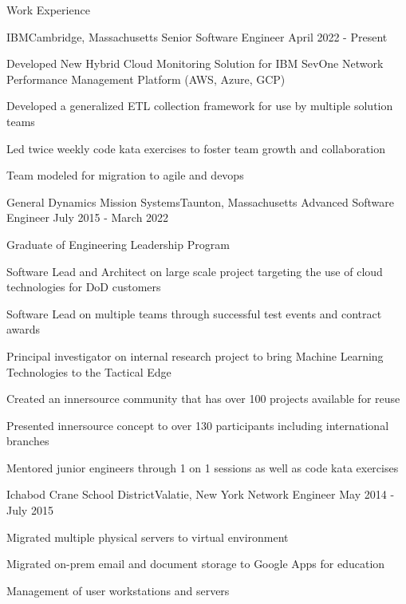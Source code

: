 \documentclass{resume} %
\begin{document}
\begin{rSection}{Work Experience}

\begin{rSubsection}{IBM}{Cambridge, Massachusetts}
{Senior Software Engineer}
{April 2022 - Present}
\item Developed New Hybrid Cloud Monitoring Solution for IBM SevOne Network Performance Management Platform (AWS, Azure, GCP)
\item Developed a generalized ETL collection framework for use by multiple solution teams
\item Led twice weekly code kata exercises to foster team growth and collaboration
\item Team modeled for migration to agile and devops
\end{rSubsection}

\begin{rSubsection}{General Dynamics Mission Systems}{Taunton, Massachusetts}
{Advanced Software Engineer}
{July 2015 - March 2022}
 \item Graduate of Engineering Leadership Program
 \item Software Lead and Architect on large scale project targeting the use of cloud technologies for DoD customers
 \item Software Lead on multiple teams through successful test events and contract awards
 \item Principal investigator on internal research project to bring  Machine Learning Technologies to the Tactical Edge
 \item Created an innersource community that has over 100 projects available for reuse
 \item Presented innersource concept to over 130 participants including international branches
 \item Mentored junior engineers through 1 on 1 sessions as well as code kata exercises
\end{rSubsection}

\begin{rSubsection}{Ichabod Crane School District}{Valatie, New York}
{Network Engineer}
{ May 2014 - July 2015}
\item Migrated multiple physical servers to virtual environment
\item Migrated on-prem email and document storage to Google Apps for education
\item Management of user workstations and servers

\end{rSubsection}

\end{rSection}
\end{document}
